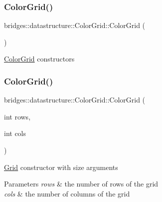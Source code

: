 \subsubsection{\texorpdfstring{Color\+Grid()}{ColorGrid()}\hspace{0.1cm}{\footnotesize\ttfamily [1/4]}}
{\footnotesize\ttfamily bridges\+::datastructure\+::\+Color\+Grid\+::\+Color\+Grid (\begin{DoxyParamCaption}{ }\end{DoxyParamCaption})\hspace{0.3cm}{\ttfamily [inline]}}

\hyperlink{classbridges_1_1datastructure_1_1_color_grid}{Color\+Grid} constructors \mbox{\label{classbridges_1_1datastructure_1_1_color_grid_a96a8df5eab72fb32c358ba12f2d4483b}} 
\subsubsection{\texorpdfstring{Color\+Grid()}{ColorGrid()}\hspace{0.1cm}{\footnotesize\ttfamily [2/4]}}
{\footnotesize\ttfamily bridges\+::datastructure\+::\+Color\+Grid\+::\+Color\+Grid (\begin{DoxyParamCaption}\item[{int}]{rows,  }\item[{int}]{cols }\end{DoxyParamCaption})\hspace{0.3cm}{\ttfamily [inline]}}

\hyperlink{classbridges_1_1datastructure_1_1_grid}{Grid} constructor with size arguments


\begin{DoxyParams}{Parameters}
{\em rows} & the number of rows of the grid \\
\hline
{\em cols} & the number of columns of the grid \\
\hline
\end{DoxyParams}
\mbox{\label{classbridges_1_1datastructure_1_1_color_grid_a28f65f52274748d314ee47089e961c2c}} 
